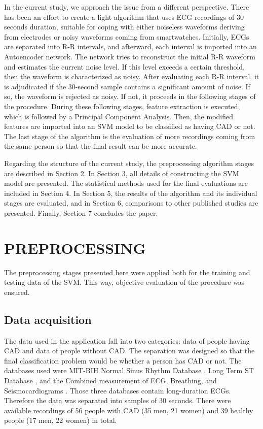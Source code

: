 In the current study, we approach the issue from a different perspective. There has been an effort to create a light algorithm that uses ECG recordings of 30 seconds duration, suitable for coping with either noiseless waveforms deriving from electrodes or noisy waveforms coming from smartwatches. Initially, ECGs are separated into R-R intervals, and afterward, each interval is imported into an Autoencoder network. The network tries to reconstruct the initial R-R waveform and estimates the current noise level. If this level exceeds a certain threshold, then the waveform is characterized as noisy. After evaluating each R-R interval, it is adjudicated if the 30-second sample contains a significant amount of noise. If so, the waveform is rejected as noisy. If not, it proceeds in the following stages of the procedure.
During these following stages, feature extraction is executed, which is followed by a Principal Component Analysis. Then, the modified features are imported into an SVM model to be classified as having CAD or not. The last stage of the algorithm is the evaluation of more recordings coming from the same person so that the final result can be more accurate.

Regarding the structure of the current study, the preprocessing algorithm stages are described in Section 2. In Section 3, all details of constructing the SVM model are presented. The statistical methods used for the final evaluations are included in Section 4. In Section 5, the results of the algorithm and its individual stages are evaluated, and in Section 6, comparisons to other published studies are presented. Finally, Section 7 concludes the paper.


\section{PREPROCESSING}
\label{sec:preprocessing}

The preprocessing stages presented here were applied both for the training and testing data of the SVM. This way, objective evaluation of the procedure was ensured.

\subsection{Data acquisition}
\label{ssec:data_acquisition}

The data used in the application fall into two categories: data of people having CAD and data of people without CAD. The separation was designed so that the final classification problem would be whether a person has CAD or not. The databases used were MIT-BIH Normal Sinus Rhythm Database \cite{MIT-BIH-Normal_sinus}, Long Term ST Database \cite{Long_Term_ST}, and the Combined measurement of ECG, Breathing, and Seismocardiograms \cite{combined_ecg_database}. Those three databases contain long-duration ECGs. Therefore the data was separated into samples of 30 seconds. There were available recordings of 56 people with CAD (35 men, 21 women) and 39 healthy people (17 men, 22 women) in total. 

